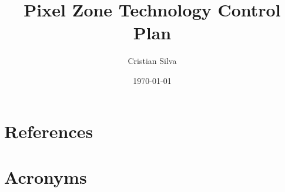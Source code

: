 \documentclass[PMO,authoryear,lsstdraft,toc]{lsstdoc}
\title{Pixel Zone Technology Control Plan}
\author{%
Cristian Silva
}
\date{\today}
\begin{document}
\maketitle




\appendix
\section{References} \label{sec:bib}
\renewcommand{\refname}{} %


\section{Acronyms} \label{sec:acronyms}

\end{document}
